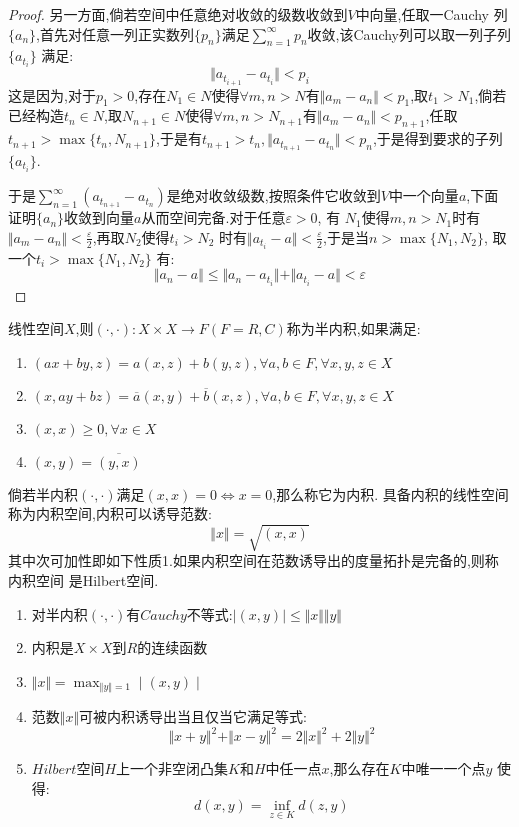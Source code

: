 \begin{enumerate}
\begin{proof}
  另一方面,倘若空间中任意绝对收敛的级数收敛到$V$中向量,任取一Cauchy 列$\{a_n\}$,首先对任意一列正实数列$\{p_n\}$满足$\sum_ {n=1}^{\infty}p_n$收敛,该Cauchy列可以取一列子列$\{a_{t_i}\}$ 满足:
  $$\Vert a_{t_{i+1}}-a_{t_i}\Vert<p_i$$
  这是因为,对于$p_1>0$,存在$N_1\in N$使得$\forall m,n>N$有$\Vert a_m-a_n\Vert<p_1$,取$t_1>N_1$,倘若已经构造$t_n\in N$,取$N_{n+1}\in N$使得$\forall m,n>N_{n+1}$有$\Vert a_m-a_n\Vert<p_{n+1}$,任取$t_{n+1}>\max\{t_n,N_{n+1}\}$,于是有$t_{n+1}>t_n,\Vert a_{t_{n+1}}-a_{t_n}\Vert<p_n$,于是得到要求的子列$\{a_{t_i}\}$.

  于是$\sum_{n=1}^{\infty}\left(a_{t_{n+1}}-a_{t_n}\right)$是绝对收敛级数,按照条件它收敛到$V$中一个向量$a$,下面证明$\{a_n\}$收敛到向量$a$从而空间完备.对于任意$\varepsilon>0$, 有
  $N_1$使得$m,n>N_1$时有$\Vert a_m-a_n\Vert<\frac{\varepsilon}{2}$,再取$N_2$使得$t_i>N_2$ 时有$\Vert a_{t_i}-a\Vert<\frac{\varepsilon}{2}$,于是当$n>\max\{N_1,N_2\}$, 取一个$t_i>\max\{N_1,N_2\}$ 有:$$\Vert a_n-a\Vert\le\Vert a_n-a_{t_i}\Vert+\Vert a_{t_i}-a\Vert<\varepsilon$$
  \end{proof}
\end{enumerate}

线性空间$X$,则$(\cdot,\cdot):X\times X\to F(F=R,C)$称为半内积,如果满足:
\begin{enumerate}
  \item $(ax+by,z)=a(x,z)+b(y,z),\forall a,b\in F,\forall x,y,z\in X$
  \item $(x,ay+bz)=\overline{a}(x,y)+\overline{b}(x,z),\forall a,b\in F,\forall x,y,z\in X$
  \item $(x,x)\ge0,\forall x\in X$
  \item $(x,y)=\overline{(y,x)}$
\end{enumerate}
倘若半内积$(\cdot,\cdot)$满足$(x,x)=0\Leftrightarrow x=0$,那么称它为内积.
具备内积的线性空间称为内积空间,内积可以诱导范数:
$$\Vert x\Vert=\sqrt{(x,x)}$$
其中次可加性即如下性质1.如果内积空间在范数诱导出的度量拓扑是完备的,则称内积空间
是Hilbert空间.

\begin{enumerate}
  \item 对半内积$(\cdot,\cdot)$有$Cauchy$不等式:$\mid (x,y)\mid\le\Vert x\Vert \Vert y\Vert$
  \item 内积是$X\times X$到$R$的连续函数
  \item $\Vert x\Vert=\max_{\Vert y\Vert=1}\mid(x,y)\mid$
  \item 范数$\Vert x\Vert$可被内积诱导出当且仅当它满足等式:
  $$\Vert x+y\Vert^2+\Vert x-y\Vert^2=2\Vert x\Vert^2+2\Vert y\Vert^2$$
  \item $Hilbert$空间$H$上一个非空闭凸集$K$和$H$中任一点$x$,那么存在$K$中唯一一个点$y$ 使得:
  $$d(x,y)=\inf_{z\in K}d(z,y)$$
\end{enumerate}

